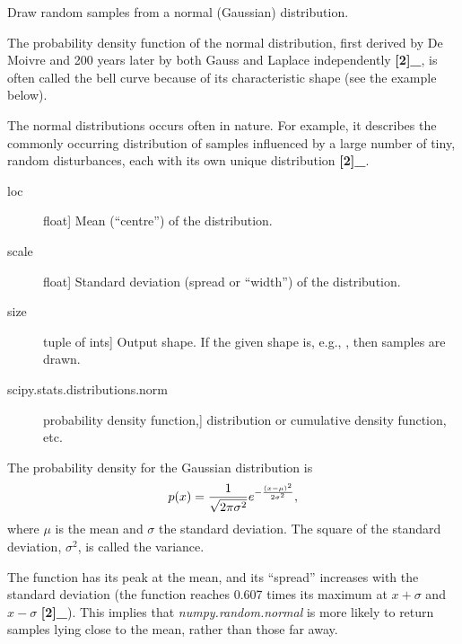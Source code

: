 \documentclass[letterpaper,10pt,english]{sphinxmanual}
\begin{document}
\begin{fulllineitems}
\label{pygeomod:pygeomod.geomodeller_xml_obj.normal}
Draw random samples from a normal (Gaussian) distribution.

The probability density function of the normal distribution, first
derived by De Moivre and 200 years later by both Gauss and Laplace
independently {\color{red}\bfseries{}{[}2{]}\_}, is often called the bell curve because of
its characteristic shape (see the example below).

The normal distributions occurs often in nature.  For example, it
describes the commonly occurring distribution of samples influenced
by a large number of tiny, random disturbances, each with its own
unique distribution {\color{red}\bfseries{}{[}2{]}\_}.
\begin{description}
\item[{loc}] \leavevmode{[}float{]}
Mean (``centre'') of the distribution.

\item[{scale}] \leavevmode{[}float{]}
Standard deviation (spread or ``width'') of the distribution.

\item[{size}] \leavevmode{[}tuple of ints{]}
Output shape.  If the given shape is, e.g., , then
 samples are drawn.

\end{description}
\begin{description}
\item[{scipy.stats.distributions.norm}] \leavevmode{[}probability density function,{]}
distribution or cumulative density function, etc.

\end{description}

The probability density for the Gaussian distribution is
\begin{gather}
\begin{split}p(x) = \frac{1}{\sqrt{ 2 \pi \sigma^2 }}
e^{ - \frac{ (x - \mu)^2 } {2 \sigma^2} },\end{split}\notag
\end{gather}
where \(\mu\) is the mean and \(\sigma\) the standard deviation.
The square of the standard deviation, \(\sigma^2\), is called the
variance.

The function has its peak at the mean, and its ``spread'' increases with
the standard deviation (the function reaches 0.607 times its maximum at
\(x + \sigma\) and \(x - \sigma\) {\color{red}\bfseries{}{[}2{]}\_}).  This implies that
\emph{numpy.random.normal} is more likely to return samples lying close to the
mean, rather than those far away.


\end{fulllineitems}
\end{document}
